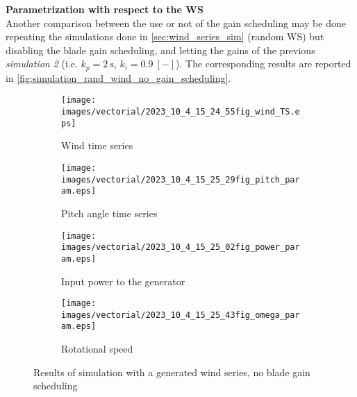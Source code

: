 \textbf{Parametrization with respect to the WS}\\
Another comparison between the use or not of the gain scheduling may be done repeating the simulations done in \autoref{sec:wind_series_sim} (random WS) but disabling the blade gain scheduling, and letting the gains of the previous \textit{simulation 2} (i.e. $k_p = 2 \ \si{\second}$, $k_i=0.9 \ [-]$). The corresponding results are reported in \autoref{fig:simulation_rand_wind_no_gain_scheduling}.
\begin{figure}[!htbp]
  \begin{subfigure}{0.5\columnwidth}
    \centering
    \texttt{[image: images/vectorial/2023\_10\_4\_15\_24\_55fig\_wind\_TS.eps]}
    \caption{Wind time series}
    \label{fig:2023_05_8_22_43_35fig_wind_TS}
  \end{subfigure}
  \begin{subfigure}{0.5\columnwidth}
    \centering
    \texttt{[image: images/vectorial/2023\_10\_4\_15\_25\_29fig\_pitch\_param.eps]}
    \caption{Pitch angle time series}
    \label{fig:2023_05_8_22_44_05fig_pitch_param}
  \end{subfigure}
  \begin{subfigure}{0.5\columnwidth}
    \centering
    \texttt{[image: images/vectorial/2023\_10\_4\_15\_25\_02fig\_power\_param.eps]}
    \caption{Input power to the generator}
    \label{fig:2023_05_8_22_44_15fig_power_param}
  \end{subfigure}
  \begin{subfigure}{0.5\columnwidth}
    \centering
    \texttt{[image: images/vectorial/2023\_10\_4\_15\_25\_43fig\_omega\_param.eps]}
    \caption{Rotational speed}
    \label{fig:2023_05_8_23_17_57fig_omega_param}
  \end{subfigure}
  \caption{Results of simulation with a generated wind series, no blade gain scheduling}
  \label{fig:simulation_rand_wind_no_gain_scheduling}
\end{figure}

